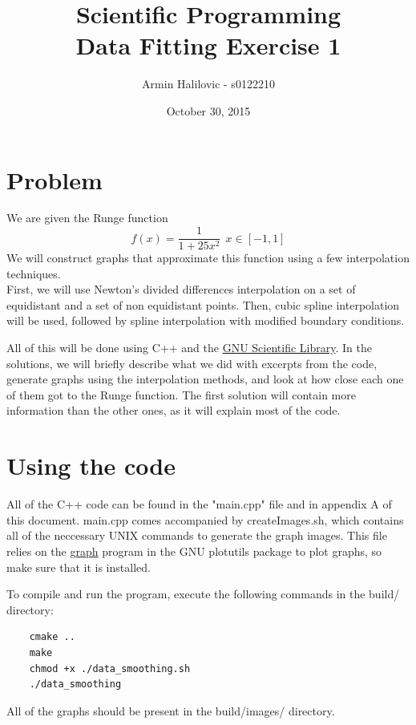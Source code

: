 \documentclass[11pt, a4paper, titlepage, openright]{article}
\title{\LARGE Scientific Programming \\ \normalsize Data Fitting Exercise 1}
\author{Armin Halilovic - s0122210}
\date{October 30, 2015}
\begin{document}

\onecolumn
\tableofcontents
\newpage



\section{Problem}
    We are given the Runge function  \[f(x) = \frac{1}{1 + 25 x^{2}} \ \ x \in [-1, 1] \]
    We will construct graphs that approximate this function using a few interpolation techniques. \\
    First, we will use Newton's divided differences interpolation on a set of equidistant and a set of non equidistant points.
    Then, cubic spline interpolation will be used, followed by spline interpolation with modified boundary conditions.

    All of this will be done using C++ and the \href{http://www.gnu.org/software/gsl/}{GNU Scientific Library}.
    In the solutions, we will briefly describe what we did with excerpts from the code, generate graphs using the interpolation methods,
    and look at how close each one of them got to the Runge function. The first solution will contain more information than
    the other ones, as it will explain most of the code.

\section{Using the code}
    All of the C++ code can be found in the "main.cpp" file and in appendix A of this document.
    main.cpp comes accompanied by createImages.sh, which contains all of the neccessary UNIX commands to generate the graph images.
    This file relies on the \href{https://www.gnu.org/software/plotutils/manual/en/html_node/graph.html}{graph} program
    in the GNU plotutils package to plot graphs, so make sure that it is installed.

    To compile and run the program, execute the following commands in the build/ directory:
    \begin{lstlisting}
    cmake ..
    make
    chmod +x ./data_smoothing.sh
    ./data_smoothing
    \end{lstlisting}
    All of the graphs should be present in the build/images/ directory.

\newpage
\end{document}

